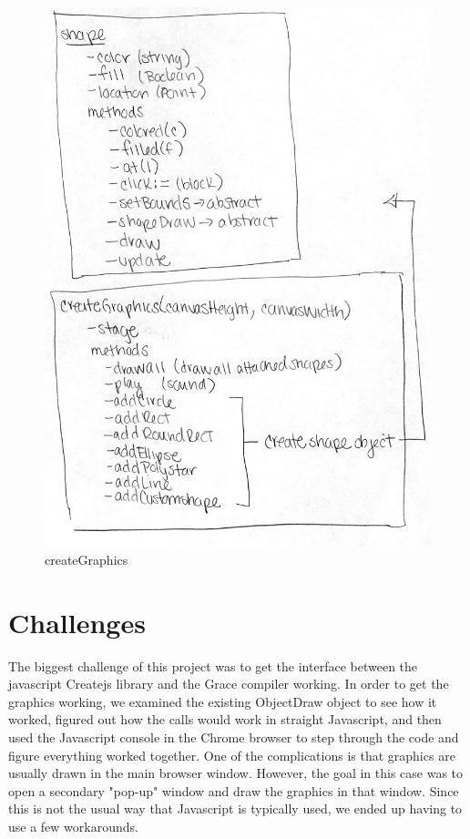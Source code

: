 \documentclass{article}
\begin{document}
\begin{figure}
\includegraphics[scale=0.5]{createGraphics}
\centering
\caption{createGraphics}
\label{fig:createGraphics}
\end{figure}

\section{Challenges}
The biggest challenge of this project was to get the interface between the javascript Createjs library and the Grace
compiler working. In order to get the graphics working, we examined the existing ObjectDraw object to see
how it worked, figured out how the calls would work in straight Javascript, and then used the Javascript console
in the Chrome browser to step through the code and figure everything worked together. One of the complications
is that graphics are usually drawn in the main browser window. However, the goal in this case was to open a
secondary "pop-up" window and draw the graphics in that window. Since this is not the usual way that Javascript
is typically used, we ended up having to use a few workarounds.
\end{document}
